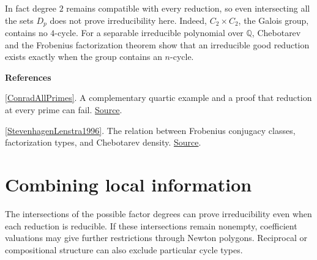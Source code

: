 \documentclass[11pt,a4paper,oneside,openany]{book}
\newenvironment{sources}{\par\smallskip\begingroup\footnotesize\color{atlasgray}\leftskip=10pt\setlength{\parskip}{2pt}}{\par\endgroup\smallskip}
\begin{document}
\color{black} In fact degree \(2\) remains compatible with every reduction, so even intersecting all the sets \(D_p\) does not prove irreducibility here. Indeed, \(C_2\times C_2\), the Galois group, contains no \(4\)-cycle. For a separable irreducible polynomial over \(\mathbb Q\), Chebotarev and the Frobenius factorization theorem show that an irreducible good reduction exists exactly when the group contains an \(n\)-cycle.\par
\begin{sources}
\textbf{References}\par\smallskip
\noindent\hyperlink{ref:ConradAllPrimes}{[ConradAllPrimes]}. A complementary quartic example and a proof that reduction at every prime can fail. \href{https://kconrad.math.uconn.edu/blurbs/ringtheory/reducibleallp.pdf}{Source}.\par
\noindent\hyperlink{ref:StevenhagenLenstra1996}{[StevenhagenLenstra1996]}. The relation between Frobenius conjugacy classes, factorization types, and Chebotarev density. \href{https://pub.math.leidenuniv.nl/~lenstrahw/PUBLICATIONS/1996d/art.pdf}{Source}.\par
\end{sources}\color{black}
\section{Combining local information}
\color{black} The intersections of the possible factor degrees can prove irreducibility even when each reduction is reducible. If these intersections remain nonempty, coefficient valuations may give further restrictions through Newton polygons. Reciprocal or compositional structure can also exclude particular cycle types.\par
\end{document}
